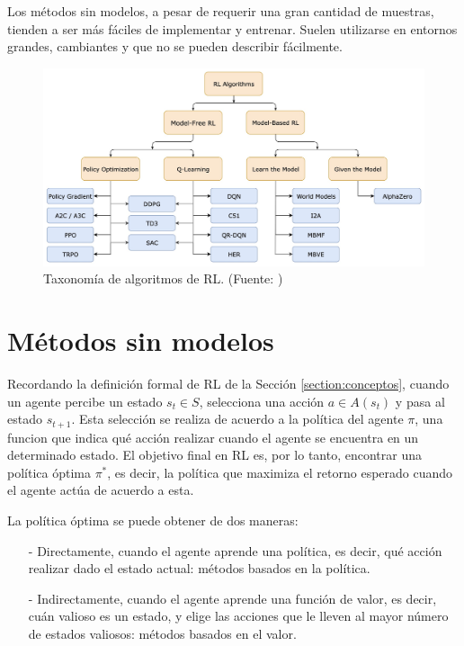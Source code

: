 Los métodos sin modelos, a pesar de requerir una gran cantidad de muestras, tienden a ser más fáciles de implementar y entrenar. Suelen utilizarse en entornos grandes, cambiantes y que no se pueden describir fácilmente.

\begin{figure}[H]
    \centering
    \includegraphics[width=15cm]{figures/taxonomia-rl.jpg}
    \caption[Taxonomía de algoritmos de RL]{Taxonomía de algoritmos de RL. (Fuente: \parencite{openai-rl})}
    \label{taxonomia-rl}
\end{figure}

\section{Métodos sin modelos}

Recordando la definición formal de RL de la Sección \ref{section:conceptos}, cuando un agente percibe un estado $s_t \in S$, selecciona una acción $a \in A(s_t)$  y pasa al estado $s_{t+1}$. Esta selección se realiza de acuerdo a la política del agente $\pi$, una funcion que indica qué acción realizar cuando el agente se encuentra en un determinado estado. El objetivo final en RL es, por lo tanto, encontrar una política óptima $\pi^{*}$, es decir, la política que maximiza el retorno esperado cuando el agente actúa de acuerdo a esta.

La política óptima se puede obtener de dos maneras:
\begin{enumerate}
    \item[-] Directamente, cuando el agente aprende una política, es decir, qué acción realizar dado el estado actual: métodos basados en la política.
    \item[-] Indirectamente, cuando el agente aprende una función de valor, es decir, cuán valioso es un estado, y elige las acciones que le lleven al mayor número de estados valiosos: métodos basados en el valor. 
\end{enumerate}

